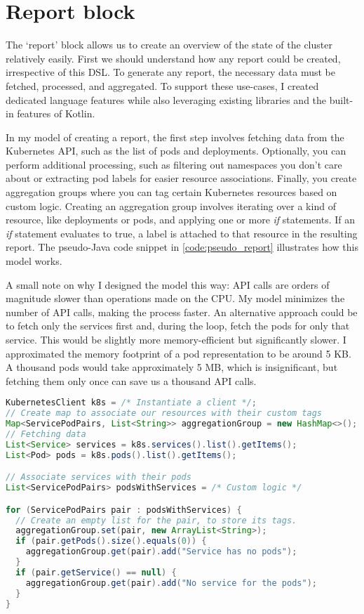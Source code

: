 \section{Report block}
\label{sec:report}

The `report' block allows us to create an overview of the state of the cluster relatively easily. First we should understand how any report could be created, irrespective of this DSL. To generate any report, the necessary data must be fetched, processed, and aggregated. To support these use-cases, I created dedicated language features while also leveraging existing libraries and the built-in features of Kotlin.

In my model of creating a report, the first step involves fetching data from the Kubernetes API, such as the list of pods and deployments. Optionally, you can perform additional processing, such as filtering out namespaces you don't care about or extracting pod labels for easier resource associations. Finally, you create aggregation groups where you can tag certain Kubernetes resources based on custom logic. Creating an aggregation group involves iterating over a kind of resource, like deployments or pods, and applying one or more \emph{if} statements. If an \emph{if} statement evaluates to true, a label is attached to that resource in the resulting report. The pseudo-Java code snippet in \ref{code:pseudo_report} illustrates how this model works.

A small note on why I designed the model this way: API calls are orders of magnitude slower than operations made on the CPU. My model minimizes the number of API calls, making the process faster. An alternative approach could be to fetch only the services first and, during the loop, fetch the pods for only that service. This would be slightly more memory-efficient but significantly slower. I approximated the memory footprint of a pod representation to be around 5 KB. A thousand pods would take approximately 5 MB, which is insignificant, but fetching them only once can save us a thousand API calls.

\begin{minipage}{\linewidth}
\begin{lstlisting}[caption={Example report in pseudo-Java},language=Java,label=code:pseudo_report]
KubernetesClient k8s = /* Instantiate a client */;
// Create map to associate our resources with their custom tags
Map<ServicePodPairs, List<String>> aggregationGroup = new HashMap<>();
// Fetching data
List<Service> services = k8s.services().list().getItems();
List<Pod> pods = k8s.pods().list().getItems();

// Associate services with their pods
List<ServicePodPairs> podsWithServices = /* Custom logic */

for (ServicePodPairs pair : podsWithServices) {
  // Create an empty list for the pair, to store its tags.
  aggregationGroup.set(pair, new ArrayList<String>);
  if (pair.getPods().size().equals(0)) {
    aggregationGroup.get(pair).add("Service has no pods");
  }
  if (pair.getService() == null) {
    aggregationGroup.get(pair).add("No service for the pods");
  }
}
\end{lstlisting}
\end{minipage}

